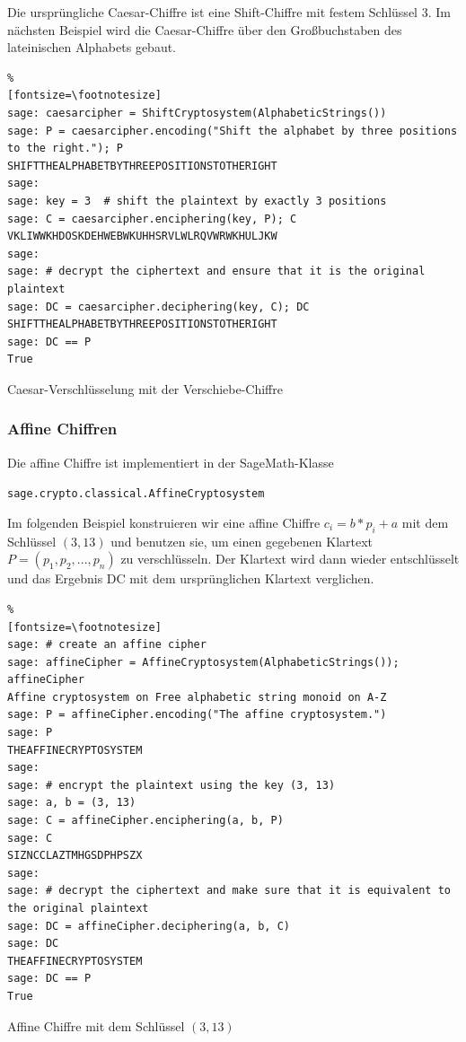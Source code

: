 \begin{refsegment}
Die ursprüngliche Caesar-Chiffre ist eine Shift-Chiffre mit
festem Schlüssel 3. Im nächsten Beispiel wird die Caesar-Chiffre
über den Großbuchstaben des lateinischen Alphabets gebaut.

\begin{sagecode}
\begin{Verbatim}%
[fontsize=\footnotesize]
sage: caesarcipher = ShiftCryptosystem(AlphabeticStrings())
sage: P = caesarcipher.encoding("Shift the alphabet by three positions to the right."); P
SHIFTTHEALPHABETBYTHREEPOSITIONSTOTHERIGHT
sage:
sage: key = 3  # shift the plaintext by exactly 3 positions
sage: C = caesarcipher.enciphering(key, P); C
VKLIWWKHDOSKDEHWEBWKUHHSRVLWLRQVWRWKHULJKW
sage:
sage: # decrypt the ciphertext and ensure that it is the original plaintext
sage: DC = caesarcipher.deciphering(key, C); DC
SHIFTTHEALPHABETBYTHREEPOSITIONSTOTHERIGHT
sage: DC == P
True
\end{Verbatim}
\caption{Caesar-Verschlüsselung mit der Verschiebe-Chiffre}
\label{paper_pencil:shift_cipher:Sage_example_Caesar_cipher}
\end{sagecode}


\subsubsection{Affine Chiffren}
\label{PaP_affine_cipher_sage-sample}

Die affine Chiffre ist implementiert in der SageMath-Klasse
\begin{center}
\verb!sage.crypto.classical.AffineCryptosystem!
\end{center}

Im folgenden Beispiel konstruieren wir eine affine Chiffre $ c_i = b*p_i + a $
mit dem Schlüssel $(3, 13)$ und benutzen sie, um einen gegebenen Klartext
$P = (p_1,p_2, ...,p_n)$ zu verschlüsseln. Der Klartext wird dann wieder
entschlüsselt und das Ergebnis DC mit dem ursprünglichen Klartext verglichen.

\begin{sagecode}
\begin{Verbatim}%
[fontsize=\footnotesize]
sage: # create an affine cipher
sage: affineCipher = AffineCryptosystem(AlphabeticStrings()); affineCipher
Affine cryptosystem on Free alphabetic string monoid on A-Z
sage: P = affineCipher.encoding("The affine cryptosystem.")
sage: P
THEAFFINECRYPTOSYSTEM
sage:
sage: # encrypt the plaintext using the key (3, 13)
sage: a, b = (3, 13)
sage: C = affineCipher.enciphering(a, b, P)
sage: C
SIZNCCLAZTMHGSDPHPSZX
sage:
sage: # decrypt the ciphertext and make sure that it is equivalent to the original plaintext
sage: DC = affineCipher.deciphering(a, b, C)
sage: DC
THEAFFINECRYPTOSYSTEM
sage: DC == P
True
\end{Verbatim}
\caption{Affine Chiffre mit dem Schlüssel $(3, 13)$}
\end{sagecode}



\end{refsegment}
